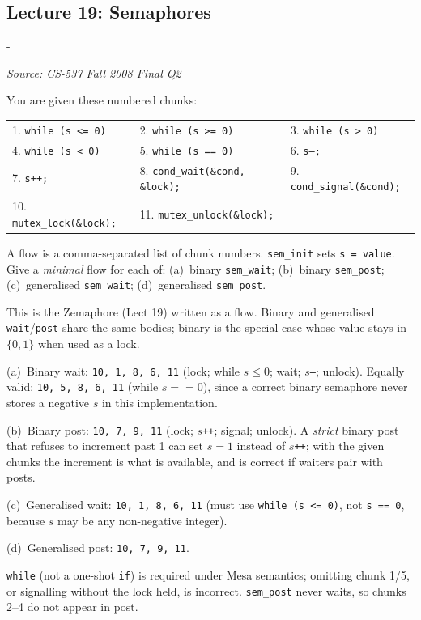 \documentclass[11pt,a4paper]{article}
\makeatletter
\newcommand{\keepspace}[1]{\par\penalty-100\begingroup
  \setlength{\dimen@}{#1}\dimen@ii\pagegoal\advance\dimen@ii-\pagetotal
  \ifdim\dimen@>\dimen@ii\ifdim\dimen@ii>\z@\vfil\fi\break\fi\endgroup}
\newcounter{qn}[section]
\newenvironment{Qn}[4]{%
  \refstepcounter{qn}\keepspace{7\baselineskip}%
  \begin{tcolorbox}[qboxstyle, title={Q\thesection.\theqn\ \ [#1 \textbar\ #2]\ \ #4}]%
  {\footnotesize\color{g3}\textit{Source: #3}}\par\smallskip%
}{%
  \end{tcolorbox}%
}
\newenvironment{Sol}{%
  \begin{tcolorbox}[sboxstyle, title={Solution}]%
}{%
  \end{tcolorbox}\vspace{0.35em}%
}
\makeatother
\begin{document}
\subsection{Lecture 19: Semaphores}

\begin{Qn}{Medium-Hard}{Lect 19}{CS-537 Fall 2008 Final Q2}{Semaphore flows: binary and generalised, from lock + CV}
You are given these numbered chunks:
\begin{center}
\footnotesize
\begin{tabular}{@{}lll@{}}
  1. \texttt{while (s <= 0)} &
  2. \texttt{while (s >= 0)} &
  3. \texttt{while (s > 0)}  \\
  4. \texttt{while (s < 0)}  &
  5. \texttt{while (s == 0)} &
  6. \texttt{s--;}           \\
  7. \texttt{s++;}           &
  8. \texttt{cond\_wait(\&cond, \&lock);} &
  9. \texttt{cond\_signal(\&cond);} \\
  10. \texttt{mutex\_lock(\&lock);} &
  11. \texttt{mutex\_unlock(\&lock);} &
\end{tabular}
\end{center}
A flow is a comma-separated list of chunk numbers. \texttt{sem\_init}
sets \texttt{s = value}. Give a \emph{minimal} flow for each of:
(a)~binary \texttt{sem\_wait}; (b)~binary \texttt{sem\_post};
(c)~generalised \texttt{sem\_wait}; (d)~generalised \texttt{sem\_post}.
\end{Qn}
\begin{Sol}
This is the Zemaphore (Lect 19) written as a flow. Binary and generalised
\texttt{wait}/\texttt{post} share the same bodies; binary is the special
case whose value stays in $\{0,1\}$ when used as a lock.

(a)~Binary wait: \texttt{10, 1, 8, 6, 11}
\quad (lock; while $s\le 0$; wait; $s$\texttt{--}; unlock).
Equally valid: \texttt{10, 5, 8, 6, 11} (while $s==0$), since a correct
binary semaphore never stores a negative $s$ in this implementation.

(b)~Binary post: \texttt{10, 7, 9, 11}
\quad (lock; $s$\texttt{++}; signal; unlock).
A \emph{strict} binary post that refuses to increment past 1 can set
$s=1$ instead of $s$\texttt{++}; with the given chunks the increment is
what is available, and is correct if waiters pair with posts.

(c)~Generalised wait: \texttt{10, 1, 8, 6, 11}
\quad (must use \texttt{while (s <= 0)}, not \texttt{s == 0}, because
$s$ may be any non-negative integer).

(d)~Generalised post: \texttt{10, 7, 9, 11}.

\texttt{while} (not a one-shot \texttt{if}) is required under Mesa
semantics; omitting chunk 1/5, or signalling without the lock held, is
incorrect. \texttt{sem\_post} never waits, so chunks 2--4 do not appear
in post.
\end{Sol}
\end{document}
